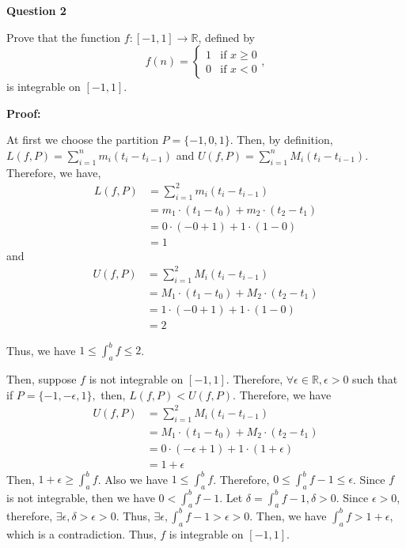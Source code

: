 \documentclass[a4paper,12pt]{report}
\newcommand{\R}{\mathbb{R}}
\begin{document}
\noindent
\textbf{Question 2}

\noindent
Prove that the function $f:[-1,1]\to\R$,
defined by 
\[
f(n) = \begin{cases} 1 &\mbox{if } x\geq 0 \\
0 & \mbox{if } x<0 \end{cases},
\]
is integrable on $[-1,1]$. 

\noindent
\textbf{Proof:}

\noindent
At first we choose the partition $P=\{-1,0,1\}$. Then, by definition, $L(f,P)=\sum_{i=1}^{n}m_i(t_i-t_{i-1})$ and $U(f,P)=\sum_{i=1}^{n}M_i(t_i-t_{i-1})$. Therefore, we have, 
\begin{align*}
L(f,P)&=\sum_{i=1}^{2}m_i(t_i-t_{i-1})\\
&=m_1\cdot{(t_1-t_0)}+m_2\cdot{(t_2-t_1)}\\
&=0\cdot{(-0+1)}+1\cdot{(1-0)}\\
&=1
\end{align*}
and 
\begin{align*}
U(f,P)&=\sum_{i=1}^{2}M_i(t_i-t_{i-1})\\
&=M_1\cdot{(t_1-t_0)}+M_2\cdot{(t_2-t_1)}\\
&=1\cdot{(-0+1)} + 1\cdot{(1-0)}\\
&=2
\end{align*}

\noindent
Thus, we have $1\leq \int_{a}^{b}f\leq 2$.

\noindent
Then, suppose $f$ is not integrable on $[-1,1]$. Therefore, $\forall \epsilon\in \mathbb{R}, \epsilon>0$ such that if $P=\{-1,-\epsilon,1\},$ then, $L(f,P)<U(f,P)$. Therefore, we have 
\begin{align*}
U(f,P)&=\sum_{i=1}^{2}M_i(t_i-t_{i-1})\\
&=M_1\cdot{(t_1-t_0)}+M_2\cdot{(t_2-t_1)}\\
&=0\cdot{(-\epsilon+1)}+1\cdot{(1+\epsilon)}\\
&=1+\epsilon
\end{align*}
Then, $1+\epsilon\geq \int_{a}^{b}f$. Also we have $1\leq \int_{a}^{b}f$. Therefore, $0\leq \int_{a}^{b}f-1\leq \epsilon$. Since $f$ is not integrable, then we have $0< \int_{a}^{b}f-1$. Let $\delta =\int_{a}^{b}f-1, \delta>0$. Since $\epsilon>0$, therefore, $\exists \epsilon, \delta>\epsilon>0$. Thus, $\exists \epsilon, \int_{a}^{b}f-1>\epsilon>0$. Then, we have $\int_{a}^{b}f>1+\epsilon$, which is a contradiction. Thus, $f$ is integrable on $[-1,1]$.  
\end{document}
